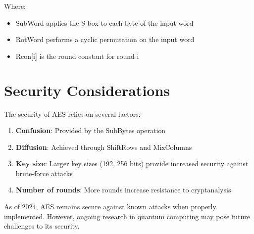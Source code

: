 \documentclass[11pt]{article}
\begin{document}
Where:
\begin{itemize}
    \item SubWord applies the S-box to each byte of the input word
    \item RotWord performs a cyclic permutation on the input word
    \item Rcon[i] is the round constant for round i
\end{itemize}

\section{Security Considerations}

The security of AES relies on several factors:

\begin{enumerate}
    \item \textbf{Confusion}: Provided by the SubBytes operation
    \item \textbf{Diffusion}: Achieved through ShiftRows and MixColumns
    \item \textbf{Key size}: Larger key sizes (192, 256 bits) provide increased security against brute-force attacks
    \item \textbf{Number of rounds}: More rounds increase resistance to cryptanalysis
\end{enumerate}

As of 2024, AES remains secure against known attacks when properly implemented. However, ongoing research in quantum computing may pose future challenges to its security.
\end{document}
